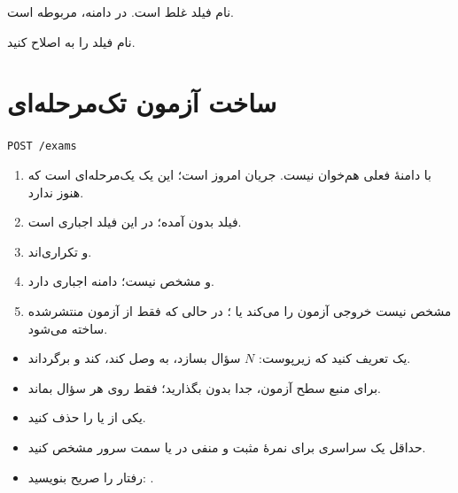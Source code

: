 \documentclass[a4paper,11pt]{article}
\newcommand{\apipath}[1]{\texttt{#1}}
\begin{document}
\begin{problembox}
نام فیلد غلط است. در دامنه،  مربوطه  است.
\end{problembox}

\begin{solutionbox}
نام فیلد را به  اصلاح کنید.
\end{solutionbox}

\section{ساخت آزمون تک‌مرحله‌ای}

\begin{apibox}
\apipath{POST /exams}
\end{apibox}

\begin{problembox}
\begin{enumerate}
  \item با دامنهٔ فعلی هم‌خوان نیست. جریان امروز
        است؛ این  یک  یک‌مرحله‌ای است که هنوز  ندارد.
  \item فیلد  بدون  آمده؛ در
         این فیلد اجباری است.
  \item {} و  تکراری‌اند.
  \item {} و  مشخص نیست؛ دامنه  اجباری دارد.
  \item مشخص نیست خروجی  آزمون را  می‌کند یا ؛
        در حالی که  فقط از آزمون منتشرشده ساخته می‌شود.
\end{enumerate}
\end{problembox}

\begin{solutionbox}
\begin{itemize}
  \item یک  تعریف کنید که زیرپوست:
        $N$ سؤال  بسازد، به  وصل کند،  کند و
         برگرداند.
  \item برای منبع  سطح آزمون،  جدا بدون  بگذارید؛
         فقط روی  هر سؤال بماند.
  \item یکی از  یا  را حذف کنید.
  \item حداقل یک  سراسری برای نمرهٔ مثبت و منفی در  یا سمت سرور مشخص کنید.
  \item رفتار را صریح بنویسید: .
\end{itemize}
\end{solutionbox}
\end{document}

